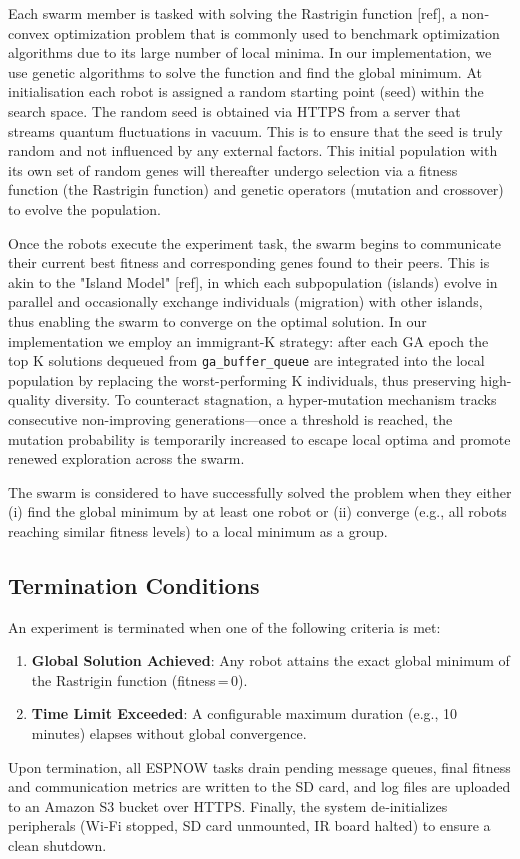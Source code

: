 \documentclass{report}
\begin{document}
Each swarm member is tasked with solving the Rastrigin function [ref], a non‐convex optimization problem that is commonly used to benchmark optimization algorithms due to its large number of local minima. In our implementation, we use genetic algorithms to solve the function and find the global minimum. At initialisation each robot is assigned a random starting point (seed) within the search space. The random seed is obtained via HTTPS from a server that streams quantum fluctuations in vacuum. This is to ensure that the seed is truly random and not influenced by any external factors. This initial population with its own set of random genes will thereafter undergo selection via a fitness function (the Rastrigin function) and genetic operators (mutation and crossover) to evolve the population.

Once the robots execute the experiment task, the swarm begins to communicate their current best fitness and corresponding genes found to their peers. This is akin to the "Island Model" [ref], in which each subpopulation (islands) evolve in parallel and occasionally exchange individuals (migration) with other islands, thus enabling the swarm to converge on the optimal solution. In our implementation we employ an immigrant-K strategy: after each GA epoch the top K solutions dequeued from \texttt{ga\_buffer\_queue} are integrated into the local population by replacing the worst-performing K individuals, thus preserving high-quality diversity. To counteract stagnation, a hyper-mutation mechanism tracks consecutive non-improving generations—once a threshold is reached, the mutation probability is temporarily increased to escape local optima and promote renewed exploration across the swarm.  

The swarm is considered to have successfully solved the problem when they either (i) find the global minimum by at least one robot or (ii) converge (e.g., all robots reaching similar fitness levels) to a local minimum as a group.

\subsection{Termination Conditions}
An experiment is terminated when one of the following criteria is met:
\begin{enumerate}
  \item \textbf{Global Solution Achieved}: Any robot attains the exact global minimum of the Rastrigin function (fitness\,=\,0).
  \item \textbf{Time Limit Exceeded}: A configurable maximum duration (e.g., 10 minutes) elapses without global convergence.
\end{enumerate}
Upon termination, all ESPNOW tasks drain pending message queues, final fitness and communication metrics are written to the SD card, and log files are uploaded to an Amazon S3 bucket over HTTPS. Finally, the system de‐initializes peripherals (Wi‐Fi stopped, SD card unmounted, IR board halted) to ensure a clean shutdown.
\end{document}
